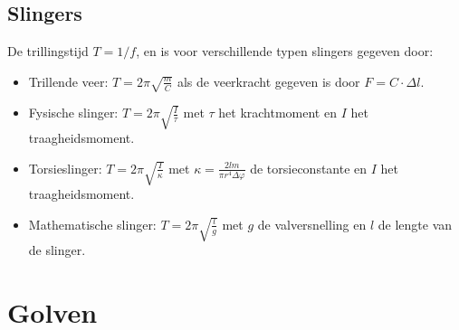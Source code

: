 \section{Slingers}
De trillingstijd $T=1/f$, en is voor verschillende typen slingers gegeven door:
\begin{itemize}
\item Trillende veer: $\displaystyle T=2\pi\sqrt{\frac{m}{C}}$ als de
      veerkracht gegeven is door $F=C\cdot\Delta l$.
\item Fysische slinger: $\displaystyle T=2\pi\sqrt{\frac{I}{\tau}}$ met
      $\tau$ het krachtmoment en $I$ het traagheidsmoment.
\item Torsieslinger: $\displaystyle T=2\pi\sqrt{\frac{I}{\kappa}}$ met
      $\displaystyle\kappa=\frac{2lm}{\pi r^4\Delta\varphi}$ de torsieconstante
      en $I$ het traagheidsmoment.
\item Mathematische slinger: $\displaystyle T=2\pi\sqrt{\frac{l}{g}}$ met
      $g$ de valversnelling en $l$ de lengte van de slinger.
\end{itemize}

\chapter{Golven}
